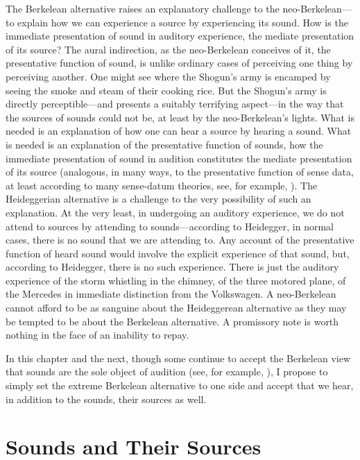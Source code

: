 The Berkelean alternative raises an explanatory challenge to the neo-Berkelean---\-to explain how we can experience a source by experiencing its sound. How is the immediate presentation of sound in auditory experience, the mediate presentation of its source? The aural indirection, as the neo-Berkelean conceives of it, the presentative function of sound, is unlike ordinary cases of perceiving one thing by perceiving another. One might see where the Shogun's army is encamped by seeing the smoke and steam of their cooking rice. But the Shogun's army is directly perceptible---and presents a suitably terrifying aspect---in the way that the sources of sounds could not be, at least by the neo-Berkelean's lights. What is needed is an explanation of how one can hear a source by hearing a sound. What is needed is an explanation of the presentative function of sounds, how the immediate presentation of sound in audition constitutes the mediate presentation of its source (analogous, in many ways, to the presentative function of sense data, at least according to many sense-datum theories, see, for example, \citealt{Price:1932fk}). The Heideggerian alternative is a challenge to the very possibility of such an explanation. At the very least, in undergoing an auditory experience, we do not attend to sources by attending to sounds---according to Heidegger, in normal cases, there is no sound that we are attending to. Any account of the presentative function of heard sound would involve the explicit experience of that sound, but, according to Heidegger, there is no such experience. There is just the auditory experience of the storm whistling in the chimney, of the three motored plane, of the Mercedes in immediate distinction from the Volkswagen. A neo-Berkelean cannot afford to be as sanguine about the Heideggerean alternative as they may be tempted to be about the Berkelean alternative. A promissory note is worth nothing in the face of an inability to repay.

In this chapter and the next, though some continue to accept the Berkelean view that sounds are the sole object of audition (see, for example, \citealt{Smith:2002sa}), I propose to simply set the extreme Berkelean alternative to one side and accept that we hear, in addition to the sounds, their sources as well. 


\section{Sounds and Their Sources} %
\label{sec:sounds_and_their_sources}

